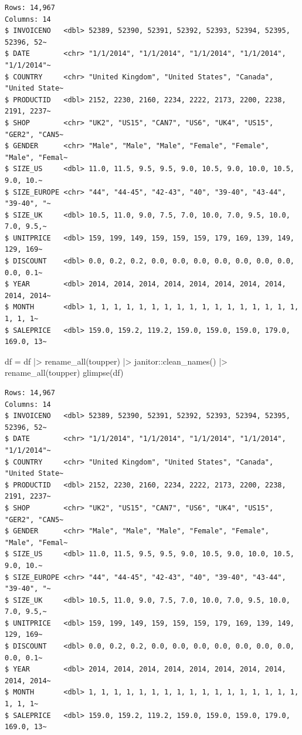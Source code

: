 \documentclass[
  letterpaper,
  DIV=11,
  numbers=noendperiod]{scrreprt}
\newenvironment{Shaded}{\begin{snugshade}}{\end{snugshade}}
\newcommand{\FunctionTok}[1]{\textcolor[rgb]{0.28,0.35,0.67}{#1}}
\newcommand{\NormalTok}[1]{\textcolor[rgb]{0.00,0.23,0.31}{#1}}
\newcommand{\OtherTok}[1]{\textcolor[rgb]{0.00,0.23,0.31}{#1}}
\newcommand{\SpecialCharTok}[1]{\textcolor[rgb]{0.37,0.37,0.37}{#1}}
\begin{document}
\begin{verbatim}
Rows: 14,967
Columns: 14
$ INVOICENO   <dbl> 52389, 52390, 52391, 52392, 52393, 52394, 52395, 52396, 52~
$ DATE        <chr> "1/1/2014", "1/1/2014", "1/1/2014", "1/1/2014", "1/1/2014"~
$ COUNTRY     <chr> "United Kingdom", "United States", "Canada", "United State~
$ PRODUCTID   <dbl> 2152, 2230, 2160, 2234, 2222, 2173, 2200, 2238, 2191, 2237~
$ SHOP        <chr> "UK2", "US15", "CAN7", "US6", "UK4", "US15", "GER2", "CAN5~
$ GENDER      <chr> "Male", "Male", "Male", "Female", "Female", "Male", "Femal~
$ SIZE_US     <dbl> 11.0, 11.5, 9.5, 9.5, 9.0, 10.5, 9.0, 10.0, 10.5, 9.0, 10.~
$ SIZE_EUROPE <chr> "44", "44-45", "42-43", "40", "39-40", "43-44", "39-40", "~
$ SIZE_UK     <dbl> 10.5, 11.0, 9.0, 7.5, 7.0, 10.0, 7.0, 9.5, 10.0, 7.0, 9.5,~
$ UNITPRICE   <dbl> 159, 199, 149, 159, 159, 159, 179, 169, 139, 149, 129, 169~
$ DISCOUNT    <dbl> 0.0, 0.2, 0.2, 0.0, 0.0, 0.0, 0.0, 0.0, 0.0, 0.0, 0.0, 0.1~
$ YEAR        <dbl> 2014, 2014, 2014, 2014, 2014, 2014, 2014, 2014, 2014, 2014~
$ MONTH       <dbl> 1, 1, 1, 1, 1, 1, 1, 1, 1, 1, 1, 1, 1, 1, 1, 1, 1, 1, 1, 1~
$ SALEPRICE   <dbl> 159.0, 159.2, 119.2, 159.0, 159.0, 159.0, 179.0, 169.0, 13~
\end{verbatim}

\begin{Shaded}
\begin{Highlighting}[]
\NormalTok{df }\OtherTok{=}\NormalTok{ df }\SpecialCharTok{|\textgreater{}}
     \FunctionTok{rename\_all}\NormalTok{(toupper) }\SpecialCharTok{|\textgreater{}}
\NormalTok{     janitor}\SpecialCharTok{::}\FunctionTok{clean\_names}\NormalTok{() }\SpecialCharTok{|\textgreater{}}
     \FunctionTok{rename\_all}\NormalTok{(toupper)}
\FunctionTok{glimpse}\NormalTok{(df)}
\end{Highlighting}
\end{Shaded}

\begin{verbatim}
Rows: 14,967
Columns: 14
$ INVOICENO   <dbl> 52389, 52390, 52391, 52392, 52393, 52394, 52395, 52396, 52~
$ DATE        <chr> "1/1/2014", "1/1/2014", "1/1/2014", "1/1/2014", "1/1/2014"~
$ COUNTRY     <chr> "United Kingdom", "United States", "Canada", "United State~
$ PRODUCTID   <dbl> 2152, 2230, 2160, 2234, 2222, 2173, 2200, 2238, 2191, 2237~
$ SHOP        <chr> "UK2", "US15", "CAN7", "US6", "UK4", "US15", "GER2", "CAN5~
$ GENDER      <chr> "Male", "Male", "Male", "Female", "Female", "Male", "Femal~
$ SIZE_US     <dbl> 11.0, 11.5, 9.5, 9.5, 9.0, 10.5, 9.0, 10.0, 10.5, 9.0, 10.~
$ SIZE_EUROPE <chr> "44", "44-45", "42-43", "40", "39-40", "43-44", "39-40", "~
$ SIZE_UK     <dbl> 10.5, 11.0, 9.0, 7.5, 7.0, 10.0, 7.0, 9.5, 10.0, 7.0, 9.5,~
$ UNITPRICE   <dbl> 159, 199, 149, 159, 159, 159, 179, 169, 139, 149, 129, 169~
$ DISCOUNT    <dbl> 0.0, 0.2, 0.2, 0.0, 0.0, 0.0, 0.0, 0.0, 0.0, 0.0, 0.0, 0.1~
$ YEAR        <dbl> 2014, 2014, 2014, 2014, 2014, 2014, 2014, 2014, 2014, 2014~
$ MONTH       <dbl> 1, 1, 1, 1, 1, 1, 1, 1, 1, 1, 1, 1, 1, 1, 1, 1, 1, 1, 1, 1~
$ SALEPRICE   <dbl> 159.0, 159.2, 119.2, 159.0, 159.0, 159.0, 179.0, 169.0, 13~
\end{verbatim}
\end{document}
